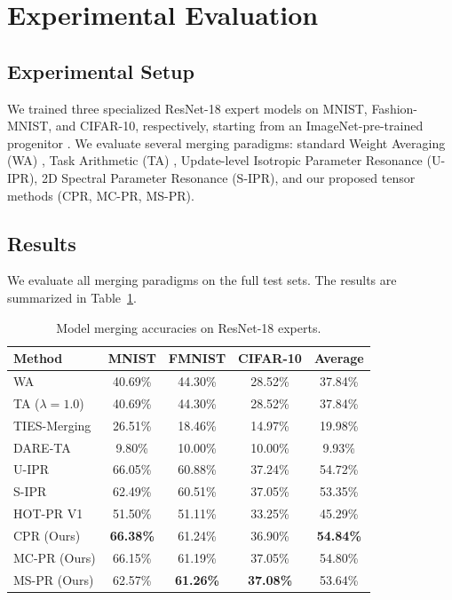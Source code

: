 \documentclass{article}
\theoremstyle{plain}
\theoremstyle{definition}
\theoremstyle{remark}
\begin{document}
\section{Experimental Evaluation}

\subsection{Experimental Setup}
We trained three specialized ResNet-18 expert models on MNIST, Fashion-MNIST, and CIFAR-10, respectively, starting from an ImageNet-pre-trained progenitor \cite{he2016deep, deng2009imagenet}. We evaluate several merging paradigms: standard Weight Averaging (WA) \cite{wortsman2022model}, Task Arithmetic (TA) \cite{ilharco2022editing}, Update-level Isotropic Parameter Resonance (U-IPR), 2D Spectral Parameter Resonance (S-IPR), and our proposed tensor methods (CPR, MC-PR, MS-PR).

\subsection{Results}
We evaluate all merging paradigms on the full test sets. The results are summarized in Table~\ref{tab:results}.

\begin{table}[t]
\caption{Model merging accuracies on ResNet-18 experts.}
\label{tab:results}
\vskip 0.15in
\begin{center}
\begin{small}
\begin{sc}
\setlength{\tabcolsep}{3pt}
\begin{tabular}{lcccc}
\toprule
Method & MNIST & FMNIST & CIFAR-10 & Average \\
\midrule
WA & 40.69\% & 44.30\% & 28.52\% & 37.84\% \\
TA ($\lambda=1.0$) & 40.69\% & 44.30\% & 28.52\% & 37.84\% \\
TIES-Merging & 26.51\% & 18.46\% & 14.97\% & 19.98\% \\
DARE-TA & 9.80\% & 10.00\% & 10.00\% & 9.93\% \\
U-IPR & 66.05\% & 60.88\% & 37.24\% & 54.72\% \\
S-IPR & 62.49\% & 60.51\% & 37.05\% & 53.35\% \\
\midrule
HOT-PR V1 & 51.50\% & 51.11\% & 33.25\% & 45.29\% \\
CPR (Ours) & \textbf{66.38\%} & 61.24\% & 36.90\% & \textbf{54.84\%} \\
MC-PR (Ours) & 66.15\% & 61.19\% & 37.05\% & 54.80\% \\
MS-PR (Ours) & 62.57\% & \textbf{61.26\%} & \textbf{37.08\%} & 53.64\% \\
\bottomrule
\end{tabular}
\end{sc}
\end{small}
\end{center}
\vskip -0.1in
\end{table}
\end{document}
